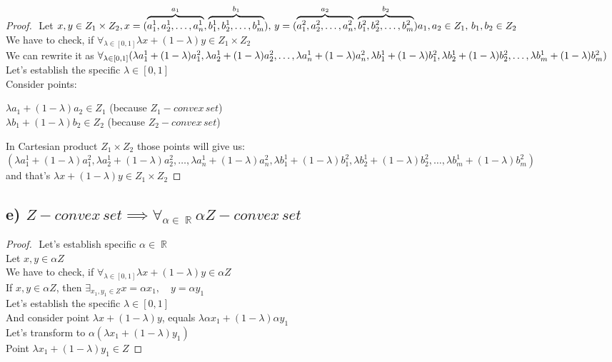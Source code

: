 \documentclass[12pt]{article}
\DeclareMathOperator{\R}{\mathbb{R}}
\begin{document}
\begin{proof}
    $ $\newline
    Let \(x, y \in Z_1 \times Z_2,\\
    x=(\overbrace{ a_1^1, a_2^1, \ldots, a_n^1}^{a_1}, \overbrace{ b_1^1, b_2^1, \ldots, b_m^1}^{b_1}),\,
    y=(\overbrace{ a_1^2, a_2^2, \ldots, a_n^2}^{a_2}, \overbrace{ b_1^2, b_2^2, \ldots, b_m^2}^{b_2})\\
    a_1,a_2 \in Z_1,\, b_1, b_2 \in Z_2 \)\\
    We have to check, if \(\forall_{\lambda \in [0,1]} \lambda x+(1-\lambda)y \in Z_1 \times Z_2\)\\
    We can rewrite it as \( \forall_{\lambda \in [0,1]}\\ (\lambda a^1_1+(1-\lambda)a^2_1, \lambda a^1_2+(1-\lambda)a^2_2, \ldots, \lambda a^1_n+(1-\lambda)a^2_n, \lambda b^1_1+(1-\lambda)b^2_1, \lambda b^1_2+(1-\lambda)b^2_2, \ldots, \lambda b^1_m+(1-\lambda)b^2_m ) \) \\
    Let's establish the specific \(\lambda \in [0,1]\)\\
    Consider points:
    \begin{center}
        \(\lambda a_1+(1-\lambda) a_2 \in Z_1\) (because \(Z_1 - convex\,set\))\\
        \(\lambda b_1+(1-\lambda)b_2 \in Z_2\) (because \(Z_2 - convex\,set\))
    \end{center}
    In Cartesian product \(Z_1 \times Z_2\) those points will give us:\\
    \((\lambda a^1_1+(1-\lambda)a^2_1, \lambda a^1_2+(1-\lambda)a^2_2, \ldots, \lambda a^1_n+(1-\lambda)a^2_n, \lambda b^1_1+(1-\lambda)b^2_1, \lambda b^1_2+(1-\lambda)b^2_2, \ldots, \lambda b^1_m+(1-\lambda)b^2_m ) \)\\
    and that's \(\lambda x+(1-\lambda)y \in Z_1 \times Z_2\)
\end{proof}

\subsection*{e) \( Z - convex\,set \implies \forall_{\alpha \in \R} \alpha Z - convex\,set\)}
\begin{proof}
    $ $\newline
    Let's establish specific \(\alpha \in \R\)\\
    Let \(x, y \in \alpha Z\)\\
    We have to check, if \(\forall_{\lambda \in [0,1]} \lambda x+(1-\lambda)y \in \alpha Z \)\\
    If \(x,y \in \alpha Z\), then \(\exists_{x_1, y_1 \in Z} x=\alpha x_1,\quad y=\alpha y_1\)\\
    Let's establish the specific \(\lambda \in [0,1]\)\\
    And consider point \(\lambda x+(1-\lambda)y\), equals \(\lambda \alpha x_1+(1-\lambda)\alpha y_1\)\\
    Let's transform to \(\alpha(\lambda  x_1+(1-\lambda) y_1)\)\\
    Point \(\lambda  x_1+(1-\lambda) y_1 \in Z\)
\end{proof}
\newpage
\end{document}
